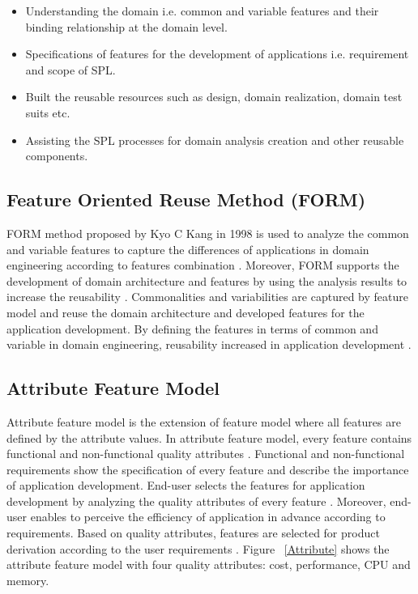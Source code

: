 \begin{itemize}
	\item Understanding the domain i.e. common and variable features and their binding relationship at the domain level.
	\item Specifications of features for the development of applications i.e. requirement and scope of SPL.
	\item Built the reusable resources such as design, domain realization, domain test suits etc.
	\item Assisting the SPL processes for domain analysis creation and other reusable components. 
\end{itemize}

\subsection{Feature Oriented Reuse Method (FORM)}
FORM method proposed by Kyo C Kang in 1998 is used to analyze the common and variable features to capture the differences of applications in domain engineering according to features combination \cite{t84}. Moreover, FORM supports the development of domain architecture and features by using the analysis results to increase the reusability \cite{t85}. Commonalities and variabilities are captured by feature model and reuse the domain architecture and developed features for the application development. By defining the features in terms of common and variable in domain engineering, reusability increased in application development \cite{t86}.  

\subsection{Attribute Feature Model}
Attribute feature model is the extension of feature model where all features are defined by the attribute values. In attribute feature model, every feature contains functional and non-functional quality attributes \cite{t87, t88}. Functional and non-functional requirements show the specification of every feature and describe the importance of application development. End-user selects the features for application development by analyzing the quality attributes of every feature \cite{t89}. Moreover, end-user enables to perceive the efficiency of application in advance according to requirements. Based on quality attributes, features are selected for product derivation according to the user requirements \cite{t90}. Figure ~\ref{Attribute} shows the attribute feature model with four quality attributes: cost, performance, CPU and memory.



